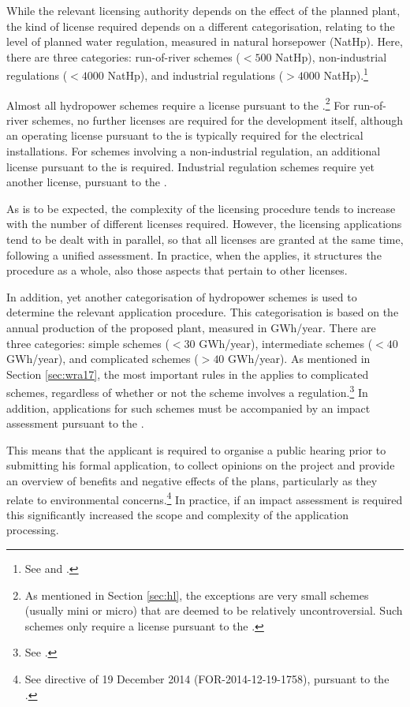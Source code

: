 While the relevant licensing authority depends on the effect of the planned plant, the kind of license required depends on a different categorisation, relating to the level of planned water regulation, measured in natural horsepower (NatHp). Here, there are three categories: run-of-river schemes  ($< 500$ NatHp), non-industrial regulations ($< 4000$ NatHp), and industrial regulations ($> 4000$ NatHp).\footnote{See \cite[2]{wra17} and \cite[1,2]{ica17}.} %

Almost all hydropower schemes require a license pursuant to the \cite[8]{wra00}.\footnote{As mentioned in Section \ref{sec:hl}, the exceptions are very small schemes (usually mini or micro) that are deemed to be relatively uncontroversial. Such schemes only require a license pursuant to the \cite{pb08}.} For run-of-river schemes, no further licenses are required for the development itself, although an operating license pursuant to the \cite{ea90} is typically required for the electrical installations. For schemes involving a non-industrial regulation, an additional license pursuant to the \cite[8]{wra17} is required. Industrial regulation schemes require yet another license, pursuant to the \cite[2]{ica17}.

As is to be expected, the complexity of the licensing procedure tends to increase with the number of different licenses required. However, the licensing applications tend to be dealt with in parallel, so that all licenses are granted at the same time, following a unified assessment. In practice, when the \cite{wra17} applies, it structures the procedure as a whole, also those aspects that pertain to other licenses. 

In addition, yet another categorisation of hydropower schemes is used to determine the relevant application procedure. This categorisation is based on the annual production of the proposed plant, measured in GWh/year. There are three categories: simple schemes ($< 30$ GWh/year), intermediate schemes ($< 40$ GWh/year), and complicated schemes ($> 40$ GWh/year). As mentioned in Section \ref{sec:wra17}, the most important rules in the \cite{wra17} applies to complicated schemes, regardless of whether or not the scheme involves a regulation.\footnote{See \cite[19]{wra00}.} In addition, applications for such schemes must be accompanied by an impact assessment pursuant to the \cite[14-6]{pb08}.

This means that the applicant is required to organise a public hearing prior to submitting his formal application, to collect opinions on the project and provide an overview of benefits and negative effects of the plans, particularly as they relate to environmental concerns.\footnote{See directive of 19 December 2014 (FOR-2014-12-19-1758), pursuant to the \cite[1-2,14-6]{pb08}.} In practice, if an impact assessment is required this significantly increased the scope and complexity of the application processing.


